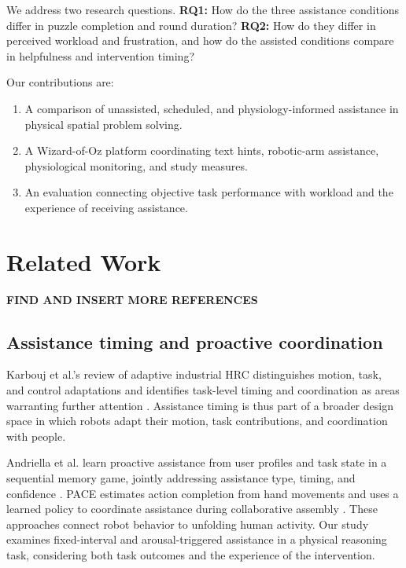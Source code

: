 \documentclass[sigconf]{aamas}
\begin{document}
We address two research questions. \textbf{RQ1:} How do the three assistance conditions differ in puzzle completion and round duration? \textbf{RQ2:} How do they differ in perceived workload and frustration, and how do the assisted conditions compare in helpfulness and intervention timing?

Our contributions are:

\begin{enumerate}
\item A comparison of unassisted, scheduled, and physiology-informed assistance in physical spatial problem solving.
\item A Wizard-of-Oz platform coordinating text hints, robotic-arm assistance, physiological monitoring, and study measures.
\item An evaluation connecting objective task performance with workload and the experience of receiving assistance.
\end{enumerate}

\section{Related Work}

\textbf{FIND AND INSERT MORE REFERENCES}

\subsection{Assistance timing and proactive coordination}

Karbouj et al.'s review of adaptive industrial HRC distinguishes motion, task, and control adaptations and identifies task-level timing and coordination as areas warranting further attention \cite{karbouj2026}. Assistance timing is thus part of a broader design space in which robots adapt their motion, task contributions, and coordination with people.

Andriella et al. learn proactive assistance from user profiles and task state in a sequential memory game, jointly addressing assistance type, timing, and confidence \cite{andriella2025}. PACE estimates action completion from hand movements and uses a learned policy to coordinate assistance during collaborative assembly \cite{delazzari2025}. These approaches connect robot behavior to unfolding human activity. Our study examines fixed-interval and arousal-triggered assistance in a physical reasoning task, considering both task outcomes and the experience of the intervention.
\end{document}
